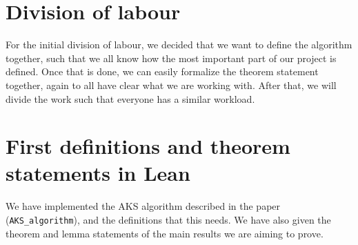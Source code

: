 \documentclass[10pt,a4paper]{article}
\newcommand{\0}{\textbf{0}}
\begin{document}
	\section*{Division of labour}
	For the initial division of labour, we decided that we want to define the algorithm together, such that we all know how the most important part of our project is defined.
	Once that is done, we can easily formalize the theorem statement together, again to all have clear what we are working with.
	After that, we will divide the work such that everyone has a similar workload.
	
	
	\section*{First definitions and theorem statements in Lean}
 	We have implemented the AKS algorithm described in the paper (\texttt{AKS_algorithm}), and the definitions that this needs. We have also given the theorem and lemma statements of the main results we are aiming to prove.
\end{document}

